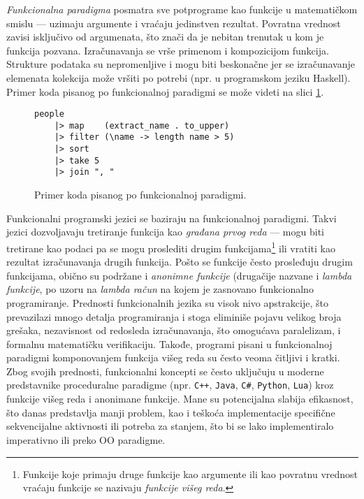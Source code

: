\emph{Funkcionalna paradigma} posmatra sve potprograme kao funkcije u matematičkom smislu --- uzimaju argumente i vraćaju jedinstven rezultat. Povratna vrednost zavisi isključivo od argumenata, što znači da je nebitan trenutak u kom je funkcija pozvana. Izračunavanja se vrše primenom i kompozicijom funkcija. Strukture podataka su nepromenljive i mogu biti beskonačne jer se izračunavanje elemenata kolekcija može vršiti po potrebi (npr. u programskom jeziku Haskell). Primer koda pisanog po funkcionalnoj paradigmi se može videti na slici \ref{fig:ParadigmFunctional}.

\begin{figure}[h!]
\begin{lstlisting}
people 
    |> map    (extract_name . to_upper) 
    |> filter (\name -> length name > 5) 
    |> sort
    |> take 5
    |> join ", "
\end{lstlisting}
\caption{Primer koda pisanog po funkcionalnoj paradigmi.}
\label{fig:ParadigmFunctional}
\end{figure}
    
Funkcionalni programski jezici se baziraju na funkcionalnoj paradigmi. Takvi jezici dozvoljavaju tretiranje funkcija kao \emph{građana prvog reda} --- mogu biti tretirane kao podaci pa se mogu proslediti drugim funkcijama\footnote{Funkcije koje primaju druge funkcije kao argumente ili kao povratnu vrednost vraćaju funkcije se nazivaju \emph{funkcije višeg reda}.} ili vratiti kao rezultat izračunavanja drugih funkcija. Pošto se funkcije često prosleđuju drugim funkcijama, obično su podržane i \emph{anonimne funkcije} (drugačije nazvane i \emph{lambda funkcije}, po uzoru na \emph{lambda račun} na kojem je zasnovano funkcionalno programiranje. Prednosti funkcionalnih jezika su visok nivo apstrakcije, što prevazilazi mnogo detalja programiranja i stoga eliminiše pojavu velikog broja grešaka, nezavisnost od redosleda izračunavanja, što omogućava paralelizam, i formalnu matematičku verifikaciju. Takođe, programi pisani u funkcionalnoj paradigmi komponovanjem funkcija višeg reda su često veoma čitljivi i kratki. Zbog svojih prednosti, funkcionalni koncepti se često uključuju u moderne predstavnike proceduralne paradigme (npr. \texttt{C++}, \texttt{Java}, \texttt{C\#}, \texttt{Python}, \texttt{Lua}) kroz funkcije vi\v{s}eg reda i anonimane funkcije. Mane su potencijalna slabija efikasnost, što danas predstavlja manji problem, kao i teškoća implementacije specifične sekvencijalne aktivnosti ili potreba za stanjem, što bi se lako implementiralo imperativno ili preko OO paradigme. 
